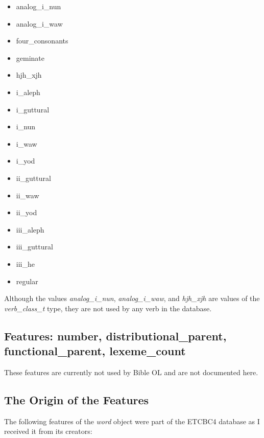\documentclass[11pt,oneside,a4paper]{memoir}
\begin{document}
\begin{itemize}
\item analog\_i\_nun
\item analog\_i\_waw
\item four\_consonants
\item geminate
\item hjh\_xjh
\item i\_aleph
\item i\_guttural
\item i\_nun
\item i\_waw
\item i\_yod
\item ii\_guttural
\item ii\_waw
\item ii\_yod
\item iii\_aleph
\item iii\_guttural
\item iii\_he
\item regular
\end{itemize}

Although the values \emph{analog\_i\_nun}, \emph{analog\_i\_waw}, and \emph{hjh\_xjh} are values of
the \emph{verb\_class\_t} type, they are not used by any verb in the database.

\subsection{Features: number, distributional\_parent, functional\_parent, lexeme\_count}

These features are currently not used by Bible OL and are not documented here.

\subsection{The Origin of the Features}\label{etcbc-origin}

The following features of the \emph{word} object were part of the ETCBC4 database as I received it
from its creators:
\end{document}
